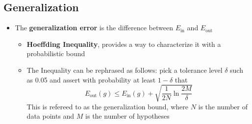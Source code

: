\documentclass[a4, english]{article}
\begin{document}
\subsection{Generalization}
\begin{itemize}
	\item The \textbf{generalization error} is the difference between $E_{\text{in}}$ and $E_\text{out}$ 
  \begin{itemize}
  	\item \textbf{Hoeffding Inequality}, provides a way to characterize it with a probabilistic bound 
    \item The Inequality can be rephrased as follows: pick a tolerance level $\delta$ such as 0.05 and assert with probability at least $1-\delta$ that
\begin{equation*}
  E_\text{out}(g) \leq E_\text{in}(g) + \sqrt{\frac1{2N} \ln \frac{2M}\delta} 
\end{equation*}
    This is refereed to as the generalization bound, where $N$ is the number of data points and $M$ is the number of hypotheses


\end{itemize}
\end{itemize}
\end{document}
